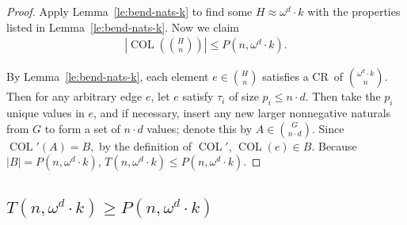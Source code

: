 \documentclass[10pt,a4paper]{article}
\newcommand{\om}{\omega}
\newcommand{\oequiv}{\approx}
\newcommand{\COL}{\operatorname{COL}}
\newcommand{\crulenospace}{CR}
\newcommand{\crule}{\crulenospace~}
\newcommand{\numpoints}{n}
\newcommand{\Commonconst}{A}
\newcommand{\Rareconst}{B}
\theoremstyle{plain}
\theoremstyle{definition}
\begin{document}
\begin{proof}
Apply Lemma~\ref{le:bend-nats-k} to find some $H \oequiv \om^d \cdot k$ with the properties listed in Lemma~\ref{le:bend-nats-k}. Now we claim \begin{align*}
 \left |   \COL \left( \binom{H}{\numpoints} \right)\right | \leq 
 P(\numpoints, \om^d \cdot k).
\end{align*}

By Lemma~\ref{le:bend-nats-k}, each element $e \in \binom{H}{\numpoints}$ satisfies a \crule of $\binom{\om^d\cdot k}{\numpoints}$. 
Then for any arbitrary edge $e$, let $e$ satisfy $\tau_i$ of size $p_i \leq \numpoints \cdot d$. 
Then take the $p_i$ unique values in $e$, and if necessary, insert any new larger nonnegative naturals from 
$G$ to form a set of $\numpoints \cdot d$ values; denote this by $\Commonconst \in \binom{G}{\numpoints \cdot d}$.
Since $\COL'(\Commonconst) = \Rareconst,$ by the definition of $\COL'$, $\COL(e) \in \Rareconst$. 
Because $|\Rareconst| = P(\numpoints,\om^d \cdot k)$, $T(\numpoints,\om^d \cdot k) \leq P(\numpoints,\om^d \cdot k)$.
\end{proof}

\subsection{\texorpdfstring{$T(\numpoints,\omega^d \cdot k) \geq P(\numpoints, \om^d \cdot k)$}{T(\numpoints, omega d k) >= P(\numpoints, omega d k)}}
\end{document}
